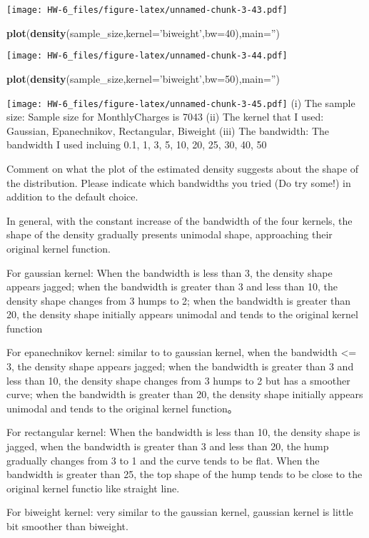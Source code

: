 \documentclass[]{article}
\newenvironment{Shaded}{\begin{snugshade}}{\end{snugshade}}
\newcommand{\DataTypeTok}[1]{\textcolor[rgb]{0.13,0.29,0.53}{#1}}
\newcommand{\DecValTok}[1]{\textcolor[rgb]{0.00,0.00,0.81}{#1}}
\newcommand{\KeywordTok}[1]{\textcolor[rgb]{0.13,0.29,0.53}{\textbf{#1}}}
\newcommand{\NormalTok}[1]{#1}
\newcommand{\StringTok}[1]{\textcolor[rgb]{0.31,0.60,0.02}{#1}}
\begin{document}
\texttt{[image: HW-6\_files/figure-latex/unnamed-chunk-3-43.pdf]}

\begin{Shaded}
\begin{Highlighting}[]
\KeywordTok{plot}\NormalTok{(}\KeywordTok{density}\NormalTok{(sample_size,}\DataTypeTok{kernel=}\StringTok{'biweight'}\NormalTok{,}\DataTypeTok{bw=}\DecValTok{40}\NormalTok{),}\DataTypeTok{main=}\StringTok{''}\NormalTok{)}
\end{Highlighting}
\end{Shaded}

\texttt{[image: HW-6\_files/figure-latex/unnamed-chunk-3-44.pdf]}

\begin{Shaded}
\begin{Highlighting}[]
\KeywordTok{plot}\NormalTok{(}\KeywordTok{density}\NormalTok{(sample_size,}\DataTypeTok{kernel=}\StringTok{'biweight'}\NormalTok{,}\DataTypeTok{bw=}\DecValTok{50}\NormalTok{),}\DataTypeTok{main=}\StringTok{''}\NormalTok{)}
\end{Highlighting}
\end{Shaded}

\texttt{[image: HW-6\_files/figure-latex/unnamed-chunk-3-45.pdf]} (i) The
sample size: Sample size for MonthlyCharges is 7043 (ii) The kernel that
I used: Gaussian, Epanechnikov, Rectangular, Biweight (iii) The
bandwidth: The bandwidth I used incluing 0.1, 1, 3, 5, 10, 20, 25, 30,
40, 50

Comment on what the plot of the estimated density suggests about the
shape of the distribution. Please indicate which bandwidths you tried
(Do try some!) in addition to the default choice.

In general, with the constant increase of the bandwidth of the four
kernels, the shape of the density gradually presents unimodal shape,
approaching their original kernel function.

For gaussian kernel: When the bandwidth is less than 3, the density
shape appears jagged; when the bandwidth is greater than 3 and less than
10, the density shape changes from 3 humps to 2; when the bandwidth is
greater than 20, the density shape initially appears unimodal and tends
to the original kernel function

For epanechnikov kernel: similar to to gaussian kernel, when the
bandwidth \textless{}= 3, the density shape appears jagged; when the
bandwidth is greater than 3 and less than 10, the density shape changes
from 3 humps to 2 but has a smoother curve; when the bandwidth is
greater than 20, the density shape initially appears unimodal and tends
to the original kernel function。

For rectangular kernel: When the bandwidth is less than 10, the density
shape is jagged, when the bandwidth is greater than 3 and less than 20,
the hump gradually changes from 3 to 1 and the curve tends to be flat.
When the bandwidth is greater than 25, the top shape of the hump tends
to be close to the original kernel functio like straight line.

For biweight kernel: very similar to the gaussian kernel, gaussian
kernel is little bit smoother than biweight.
\end{document}
